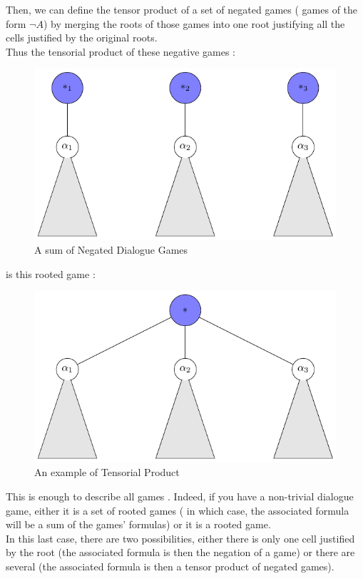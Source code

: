 \documentclass[a4paper,UKenglish]{lipics}
\begin{document}
Then, we can define the tensor product of a set of negated games ( games of the form $\neg A$) by merging the roots of those games into one root justifying all the cells justified by the original roots.\\
Thus the tensorial product of these negative games : 
\begin{figure}[H]\centering\includegraphics[scale=0.6]{dialoguegame4.pdf} \caption{A sum of Negated Dialogue Games} \end{figure}
is this rooted game :

\begin{figure}[H]\centering\includegraphics[scale=0.6]{dialoguegame5.pdf} \caption{An example of Tensorial Product} \end{figure}
This is enough to describe all games . Indeed, if you have a non-trivial dialogue game, either it is a set of rooted games ( in which case, the associated formula will be a sum of the games' formulas) or it is a rooted game. \\In this last case, there are two possibilities, either there is only one cell justified by the root (the associated formula is then the negation of a game) or there are several (the associated formula is then a tensor product of negated games).\\ 
\end{document}
